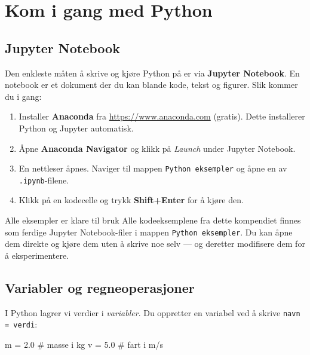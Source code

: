 \documentclass[../Main.tex]{subfiles}
\begin{document}
\chapter{Kom i gang med Python}
\label{app:python}


\section{Jupyter Notebook}

Den enkleste måten å skrive og kjøre Python på er via \textbf{Jupyter Notebook}. En notebook er et dokument der du kan blande kode, tekst og figurer. Slik kommer du i gang:

\begin{enumerate}
    \item Installer \textbf{Anaconda} fra \url{https://www.anaconda.com} (gratis). Dette installerer Python og Jupyter automatisk.
    \item Åpne \textbf{Anaconda Navigator} og klikk på \textit{Launch} under Jupyter Notebook.
    \item En nettleser åpnes. Naviger til mappen \texttt{Python eksempler} og åpne en av \texttt{.ipynb}-filene.
    \item Klikk på en kodecelle og trykk \textbf{Shift+Enter} for å kjøre den.
\end{enumerate}

\begin{mymerk*}{Alle eksempler er klare til bruk}
Alle kodeeksemplene fra dette kompendiet finnes som ferdige Jupyter Notebook-filer i mappen \texttt{Python eksempler}. Du kan åpne dem direkte og kjøre dem uten å skrive noe selv — og deretter modifisere dem for å eksperimentere.
\end{mymerk*}

\section{Variabler og regneoperasjoner}

I Python lagrer vi verdier i \emph{variabler}. Du oppretter en variabel ved å skrive \texttt{navn = verdi}:

\begin{pythonkode}
m = 2.0    # masse i kg
v = 5.0    # fart i m/s
\end{pythonkode}
\end{document}
